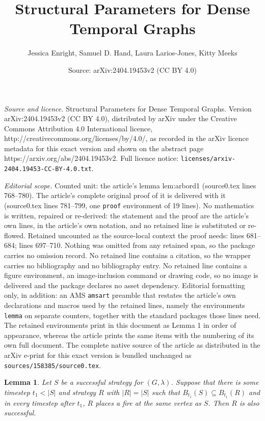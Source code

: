 \documentclass[10pt,a4paper]{amsart}
\title{Structural Parameters for Dense Temporal Graphs}
\author{Jessica Enright, Samuel D. Hand, Laura Larios-Jones, Kitty Meeks}
\date{Source: arXiv:2404.19453v2 (CC BY 4.0)}
\newtheorem{lemma}{Lemma}
\begin{document}
\maketitle

\noindent\emph{Source and licence.} Structural Parameters for Dense Temporal Graphs. Version arXiv:2404.19453v2 (CC BY 4.0), distributed by arXiv under the Creative Commons Attribution 4.0 International licence, http://creativecommons.org/licenses/by/4.0/, as recorded in the arXiv licence metadata for this exact version and shown on the abstract page https://arxiv.org/abs/2404.19453v2. Full licence notice: \texttt{licenses/arxiv-2404.19453-CC-BY-4.0.txt}.\par\smallskip

\noindent\textit{Editorial scope.} Counted unit: the article's lemma lem:arbord1 (source0.tex lines 768--780). The article's complete original proof of it is delivered with it (source0.tex lines 781--799, one \texttt{proof} environment of 19 lines). No mathematics is written, repaired or re-derived: the statement and the proof are the article's own lines, in the article's own notation, and no retained line is substituted or re-flowed.  Retained uncounted as the source-local context the proof needs: lines 681--684; lines 697--710.  Nothing was omitted from any retained span, so the package carries no omission record.  No retained line contains a citation, so the wrapper carries no bibliography and no bibliography entry.  No retained line contains a figure environment, an image-inclusion command or drawing code, so no image is delivered and the package declares no asset dependency.  Editorial formatting only, in addition: an AMS \texttt{amsart} preamble that restates the article's own declarations and macros used by the retained lines, namely the environments \texttt{lemma} on separate counters, together with the standard packages those lines need.  The retained environments print in this document as Lemma 1 in order of appearance, whereas the article prints the same items with the numbering of its own full document.  The complete native source of the article as distributed in the arXiv e-print for this exact version is bundled unchanged as \texttt{sources/158385/source0.tex}.
\begin{lemma}
\label{lem:settimelin1}
Let $S$ be a successful strategy for $(G, \lambda)$. Suppose that there is some timestep $t_1 < |S|$ and strategy $R$ with $|R|=|S|$ such that $B_{t_1}(S) \subseteq B_{t_1}(R)$ and in every timestep after $t_1$, $R$ places a fire at the same vertex as $S$. Then $R$ is also successful.
\end{lemma}
\end{document}
